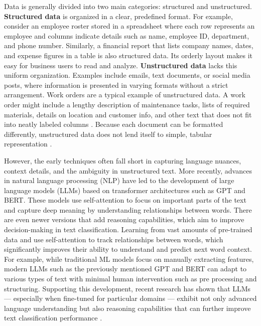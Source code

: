 Data is generally divided into two main categories: structured and unstructured. \textbf{Structured data} is organized in a clear, predefined format. For example, consider an employee roster stored in a spreadsheet where each row represents an employee and columns indicate details such as name, employee ID, department, and phone number. Similarly, a financial report that lists company names, dates, and expense figures in a table is also structured data. Its orderly layout makes it easy for business users to read and analyze. \textbf{Unstructured data} lacks this uniform organization. Examples include emails, text documents, or social media posts, where information is presented in varying formats without a strict arrangement. Work orders are a typical example of unstructured data. A work order might include a lengthy description of maintenance tasks, lists of required materials, details on location and customer info, and other text that does not fit into neatly labeled columns \cite{ibm2023work}. Because each document can be formatted differently, unstructured data does not lend itself to simple, tabular representation \cite{ibm2025datadiff}.

However, the early techniques often fall short in capturing language nuances, context details, and the ambiguity in unstructured text. More recently, advances in natural language processing (NLP) have led to the development of large language models (LLMs) based on transformer architectures such as GPT and BERT. These models use self-attention to focus on important parts of the text and capture deep meaning by understanding relationships between words. There are even newer versions that add reasoning capabilities, which aim to improve decision-making in text classification. Learning from vast amounts of pre-trained data and use self-attention to track relationships between words, which significantly improves their ability to understand and predict next word context. For example, while traditional ML models focus on manually extracting features, modern LLMs such as the previously mentioned GPT and BERT can adapt to various types of text with minimal human intervention such as pre processing and structuring. Supporting this development, recent research has shown that LLMs --- especially when fine-tuned for particular domains --- exhibit not only advanced language understanding but also reasoning capabilities that can further improve text classification performance \cite{huang2024classification} \cite{andersson2024ikea} \cite{merritt2022transformer} \cite{nazyrova2024medical} \cite{wang2024classifiers}.

